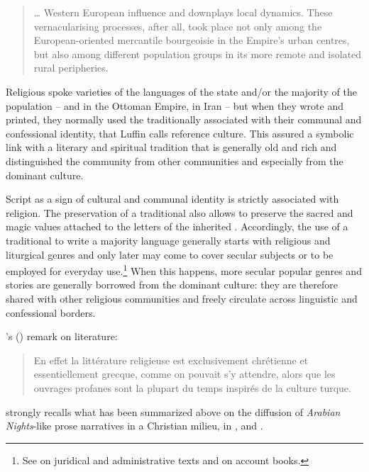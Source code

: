 \documentclass[output=paper,colorlinks,citecolor=brown,arabfont,syriacfont]{langscibook}
\begin{document}
\begin{quote}
… Western European influence and downplays local  dynamics. These vernacularising processes, after all, took place not only among the European-oriented mercantile bourgeoisie in the Empire's urban centres, but also among different population groups in its more remote and isolated rural peripheries. \citep[11]{leezenberg2021}
\end{quote}

Religious  spoke varieties of the languages of the state and/or the majority of the population -- 
 and  in the Ottoman Empire,  in Iran -- but when they wrote and printed, they normally used the  traditionally associated with their communal and confessional identity, that Luffin calls reference culture. This  assured a symbolic link with a literary and spiritual tradition that is generally old and rich and distinguished the community from other communities and especially from the dominant culture. 

Script as a sign of cultural and communal identity is strictly associated with religion. The preservation of a traditional  also allows to preserve the sacred and magic values attached to the letters of the inherited . Accordingly, the use of a traditional  to write a majority language generally starts with religious and liturgical genres and only later may come to cover secular subjects or to be employed for everyday use.\footnote{%
See \citet[345]{luffin2001} on  juridical and administrative texts and \citet[125]{moukarzel2014a} on  account books.} When this happens, more secular popular genres and stories are generally borrowed from the dominant culture: they are therefore shared with other religious communities and freely circulate across linguistic and confessional borders. 

\citeauthor{luffin2001}'s (\citeyear[342]{luffin2001}) remark on  literature:

\begin{quote}
En effet la littérature religieuse est exclusivement chrétienne et essentiellement grecque, comme on pouvait s'y attendre, alors que les ouvrages profanes sont la plupart du temps inspirés de la culture turque. 
\end{quote}

\noindent strongly recalls what has been summarized above on the diffusion of \textit{Arabian Nights}-like prose narratives in a Christian milieu, in ,  and .
\end{document}

